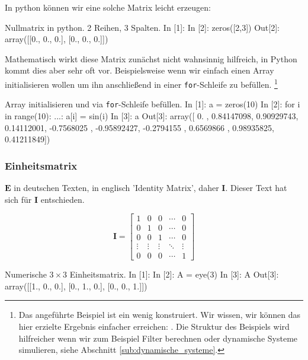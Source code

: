 In python können wir eine solche Matrix leicht erzeugen:
\begin{python}{Nullmatrix in python. 2 Reihen, 3 Spalten.}
In [1]: %
In [2]: zeros([2,3])
Out[2]:
array([[0., 0., 0.],
       [0., 0., 0.]])
\end{python}

Mathematisch wirkt diese Matrix zunächst nicht wahnsinnig hilfreich, in Python kommt dies aber sehr oft vor. Beispielsweise wenn wir einfach einen Array initialisieren wollen um ihn anschließend in einer \texttt{for}-Schleife zu befüllen. \footnote{Das angeführte Beispiel ist ein wenig konstruiert. Wir wissen, wir können das hier erzielte Ergebnis einfacher erreichen: . Die Struktur des Beispiels wird hilfreicher wenn wir zum Beispiel Filter berechnen oder dynamische Systeme simulieren, siehe Abschnitt \ref{sub:dynamische_systeme}.}

\begin{python}{Array initialisieren und via \texttt{for}-Schleife befüllen.}
In [1]: a = zeros(10)
In [2]: for i in range(10):
   ...:     a[i] = sin(i)
In [3]: a
Out[3]:
array([ 0.        ,  0.84147098,  0.90929743,  0.14112001, -0.7568025 ,
       -0.95892427, -0.2794155 ,  0.6569866 ,  0.98935825,  0.41211849])
\end{python}

\subsubsection*{Einheitsmatrix}

$\mathbf{E}$ in deutschen Texten, in englisch 'Identity Matrix', daher $\mathbf{I}$. Dieser Text hat sich für $\mathbf{I}$ entschieden.

\begin{equation}
\mathbf{I} =
\begin{bmatrix}
1 & 0 & 0 & \cdots & 0 \\
0 & 1 & 0 & \cdots & 0 \\
0 & 0 & 1 & \cdots & 0 \\
\vdots & \vdots & \vdots & \ddots & \vdots \\
0 & 0 & 0 & \cdots & 1
\end{bmatrix}
\end{equation} 


\begin{python}{Numerische $3\times 3$ Einheitsmatrix.}
In [1]: %
In [2]: A = eye(3)
In [3]: A
Out[3]:
array([[1., 0., 0.],
       [0., 1., 0.],
       [0., 0., 1.]])
\end{python}


